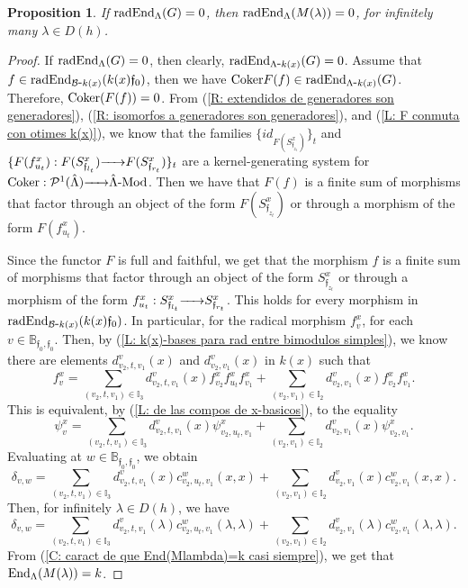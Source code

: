 \documentclass{article}
\newtheorem{proposition}[theorem]{Proposition}
\theoremstyle{definition}
\newcommand{\End}{{ \rm End }}
\newcommand{\Coker}{{ \rm Coker }}
\newcommand{\Mod}{{ \rm Mod }}
\newcommand{\rad}{{ \rm rad }}
\renewcommand{\frak}{\mathfrak}
\newcommand{\g}{\hbox{-}}
\newcommand{\hueca}[1]{\mathbb{#1}}
\newcommand{\rightmap}[1]{\smash{\mathop{\hbox to 
20pt{\rightarrowfill}}\limits^{#1}}}
\begin{document}
\begin{proposition}\label{P: radEnd(G)=0 -> radEnd(M(lambda))=0, casi todo lambda}
If $\rad\End_\Lambda(G)=0$, then $\rad \End_\Lambda(M(\lambda))=0$, for infinitely many $\lambda\in D(h)$. 
\end{proposition}

\begin{proof} If $\rad\End_\Lambda(G)=0$, then clearly, $\rad\End_{\Lambda\g k(x)}(G)=0$.  Assume that  $f\in \rad\End_{{\cal B}\g k(x)}(k(x)\frak{f}_0)$, then we have  $\Coker F(f)\in \rad\End_{\Lambda\g k(x)}(G)$. Therefore, $\Coker(F(f))=0$.  From (\ref{R: extendidos de generadores son generadores}), (\ref{R: isomorfos a generadores son generadores}), and 
(\ref{L: F conmuta con otimes k(x)}), we know that the families 
$\{id_{F(S^x_{\frak{f}_{z_t}})}\}_t$ and $\{F(f_{u_t}^x):
F(S^x_{\frak{f}_{l_t}})\rightmap{}F(S^x_{\frak{f}_{r_t}})\}_t$ are a  
kernel-generating system for $\Coker:{\cal P}^1(\hat{\Lambda})\rightmap{}\hat{\Lambda}\g\Mod$. Then we have that $F(f)$ is a finite sum of morphisms that  factor  through an object of the form $F(S^x_{\frak{f}_{z_t}})$ 
 or through a morphism of the form $F(f^x_{u_t})$. 

Since the functor $F$ is full and faithful, we get that the morphism $f$ is a finite sum of morphisms that  factor through an object of the form $S^x_{\frak{f}_{z_t}}$ or through a morphism of the form $f^x_{u_t}:S^x_{\frak{f}_{l_t}}\rightmap{}S^x_{\frak{f}_{r_t}}$. This holds for every morphism in $\rad\End_{{\cal B}\g k(x)}(k(x)\frak{f}_0)$.  
In particular, for the radical morphism $f^x_v$, for each $v\in \hueca{B}_{\frak{f}_0,\frak{f}_0}$.   Then, by (\ref{L: k(x)-bases para rad entre bimodulos simples}), we know 
there are elements $d^v_{v_2,t,v_1}(x)$ and $d^v_{v_2,v_1}(x)$ in $k(x)$ such that 
$$f^x_v=\sum_{(v_2,t,v_1)\in \hueca{I}_3}
d_{v_2,t,v_1}^v(x)f^x_{v_2}f^x_{u_t}f^x_{v_1}
+
\sum_{(v_2,v_1)\in \hueca{I}_2}
d^v_{v_2,v_1}(x)f^x_{v_2}f^x_{v_1}. $$
This is equivalent, by (\ref{L: de las compos de x-basicos}), to the equality
$$\psi_v^x=\sum_{(v_2,t,v_1)\in \hueca{I}_3}
d^v_{v_2,t,v_1}(x)\psi^x_{v_2,u_t,v_1}
+
\sum_{(v_2,v_1)\in \hueca{I}_2}d^v_{v_2,v_1}(x)\psi^x_{v_2,v_1}.$$
Evaluating at $w\in \hueca{B}_{\frak{f}_0,\frak{f}_0}$, we obtain 
$$\delta_{v,w}=\sum_{(v_2,t,v_1)\in \hueca{I}_3}
d^v_{v_2,t,v_1}(x)c^w_{v_2,u_t,v_1}(x,x)
+
\sum_{(v_2,v_1)\in \hueca{I}_2}d^v_{v_2,v_1}(x)c^w_{v_2,v_1}(x,x).$$
 Then, for infinitely $\lambda\in D(h)$, we have 
$$\delta_{v,w}=\sum_{(v_2,t,v_1)\in \hueca{I}_3}
d^v_{v_2,t,v_1}(\lambda)c^w_{v_2,u_t,v_1}(\lambda,\lambda)
+
\sum_{(v_2,v_1)\in \hueca{I}_2}d^v_{v_2,v_1}(\lambda)c^w_{v_2,v_1}(\lambda,\lambda).$$
From (\ref{C: caract de que End(Mlambda)=k casi siempre}), we get that 
$\End_\Lambda(M(\lambda))=k$. 
\end{proof}
\end{document}
